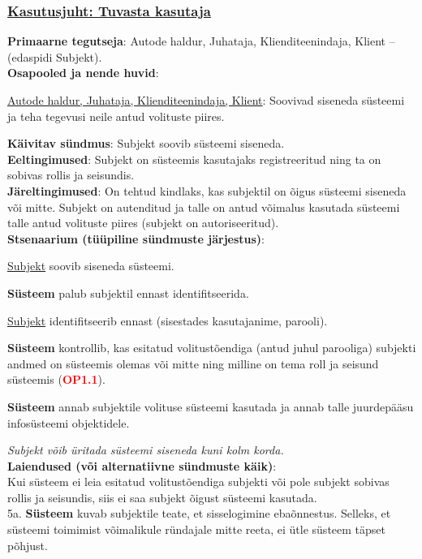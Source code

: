 \begin{shaded}
	\subsubsection{\underline{Kasutusjuht: Tuvasta kasutaja}}
	\textbf{Primaarne tegutseja}: Autode haldur, Juhataja, Klienditeenindaja, Klient – (edaspidi Subjekt). \\
	\textbf{Osapooled ja nende huvid}:
	\useDash
	\begin{myitemize}
		\item \underline{Autode haldur, Juhataja, Klienditeenindaja, Klient}: Soovivad siseneda süsteemi ja teha tegevusi neile antud volituste piires.
	\end{myitemize}
	\textbf{Käivitav sündmus}: Subjekt soovib süsteemi siseneda. \\
	\textbf{Eeltingimused}: Subjekt on süsteemis kasutajaks registreeritud ning ta on sobivas rollis ja seisundis. \\
	\textbf{Järeltingimused}: On tehtud kindlaks, kas subjektil on õigus süsteemi siseneda või mitte. Subjekt on autenditud ja talle on antud võimalus kasutada süsteemi talle antud volituste piires (subjekt on autoriseeritud). \\
	\textbf{Stsenaarium (tüüpiline sündmuste järjestus)}:
	\begin{myenumerate}
		\item \underline{Subjekt} soovib siseneda süsteemi.
		\item \textbf{Süsteem} palub subjektil ennast identifitseerida.
		\item \underline{Subjekt} identifitseerib ennast (sisestades kasutajanime, parooli).
		\item \textbf{Süsteem} kontrollib, kas esitatud volitustõendiga (antud juhul parooliga) subjekti andmed on süsteemis olemas või mitte ning milline on tema roll ja seisund süsteemis (\textbf{\textcolor{red}{OP1.1}}).
		\item \textbf{Süsteem} annab subjektile volituse süsteemi kasutada ja annab talle juurdepääsu infosüsteemi objektidele.
	\end{myenumerate}
	\textit{Subjekt võib üritada süsteemi siseneda kuni kolm korda.} \\
	\textbf{Laiendused  (või alternatiivne sündmuste käik)}: \\
	Kui süsteem ei leia esitatud volitustõendiga subjekti või pole subjekt sobivas rollis ja seisundis, siis ei saa subjekt õigust süsteemi kasutada. \\
	\indent 5a. \textbf{Süsteem} kuvab subjektile teate, et sisselogimine ebaõnnestus. Selleks, et süsteemi toimimist võimalikule ründajale mitte reeta, ei ütle süsteem täpset põhjust.
\end{shaded}

